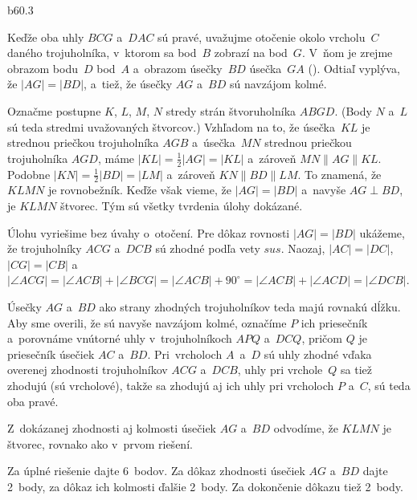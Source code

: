 {%
\epsplace b60.3 \hfil\Obr\par
Keďže oba uhly $BCG$ a~$DAC$ sú pravé,
uvažujme otočenie okolo vrcholu~$C$ daného trojuholníka,
v~ktorom sa bod~$B$ zobrazí na bod~$G$. V~ňom je zrejme
obrazom bodu~$D$ bod~$A$ a~obrazom úsečky~$BD$ úsečka~$GA$ (\obr).
Odtiaľ vyplýva, že $|AG|=|BD|$, a~tiež, že úsečky $AG$ a~$BD$ sú navzájom kolmé.
\inspicture{}

Označme postupne $K$, $L$, $M$, $N$ stredy %
strán štvoruholníka $ABGD$.
(Body $N$ a~$L$ sú teda stredmi uvažovaných štvorcov.)
Vzhľadom na to, že úsečka~$KL$ je strednou priečkou
trojuholníka $AGB$ a~úsečka~$MN$ strednou priečkou
trojuholníka $AGD$, máme $|KL|=\frac12|AG|=|KL|$ a~zároveň $MN\parallel AG\parallel KL$.
Podobne $|KN|=\frac12|BD|=|LM|$ a~zároveň $KN\parallel BD\parallel LM$.
To znamená, že $KLMN$ je rovnobežník. Keďže však vieme, že
$|AG|=|BD|$ a~navyše $AG\perp BD$, je $KLMN$ štvorec.
Tým sú všetky tvrdenia úlohy dokázané.

\ineriesenie
Úlohu vyriešime bez úvahy o~otočení. Pre dôkaz rovnosti $|AG|=|BD|$ ukážeme, že
trojuholníky $ACG$ a~$DCB$ sú zhodné podľa vety $sus$. Naozaj,
$|AC|=|DC|$, $|CG|=|CB|$
a~$|\angle ACG|=|\angle ACB|+|\angle BCG|=|\angle ACB|+90^\circ=|\angle
ACB|+|\angle ACD|=|\angle DCB|$.

Úsečky $AG$ a~$BD$ ako strany zhodných trojuholníkov teda majú rovnakú dĺžku.
Aby sme overili, že sú navyše navzájom kolmé, označíme $P$ ich priesečník
a~porovnáme vnútorné uhly v~trojuholníkoch $APQ$ a~$DCQ$, pričom $Q$ je priesečník úsečiek $AC$
a~$BD$. Pri~vrcholoch $A$~a~$D$ sú uhly zhodné vďaka overenej zhodnosti
trojuholníkov $ACG$ a~$DCB$, uhly pri vrchole~$Q$ sa tiež zhodujú (sú vrcholové), takže sa
zhodujú aj ich uhly pri vrcholoch $P$ a~$C$, sú teda oba pravé.

Z~dokázanej zhodnosti aj kolmosti úsečiek $AG$ a~$BD$ odvodíme, že $KLMN$ je štvorec,
rovnako ako v~prvom riešení.


\nobreak\medskip\petit\noindent
Za úplné riešenie dajte 6~bodov.
Za dôkaz zhodnosti úsečiek $AG$ a~$BD$ dajte 2~body, za dôkaz ich kolmosti ďalšie
2~body. Za dokončenie dôkazu tiež 2~body.
\endpetit
}

